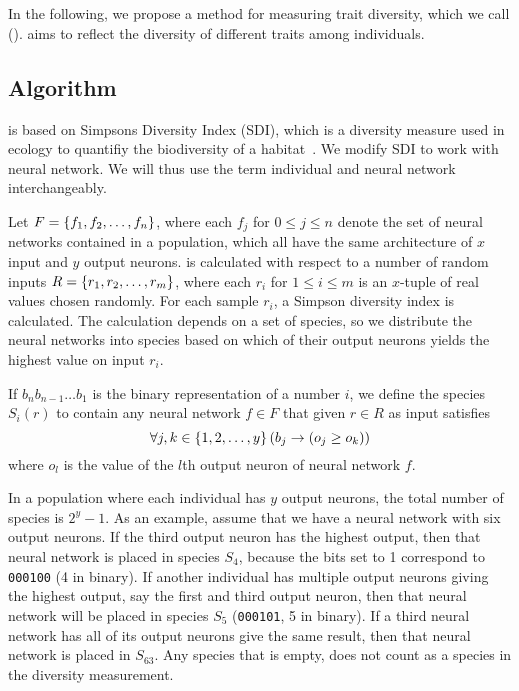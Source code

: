 \section{\di{}}
In the following, we propose a method for measuring trait diversity, which we call \emph{\di{}} (\dia). \dia{} aims to reflect the diversity of different traits among individuals. 

\subsection{Algorithm}
\dia{} is based on Simpsons Diversity Index (SDI), which is a diversity measure used in ecology to quantifiy the biodiversity of a habitat~\cite{simpson1949measurement}. We modify SDI to work with neural network. We will thus use the term individual and neural network interchangeably.

Let $F = \left\{ f_1, f_2, \dots, f_n \right\}$, where each $f_j$ for $0 \leq j \leq n$ denote the set of neural networks contained in a population, which all have the same architecture of $x$ input and $y$ output neurons. \dia{} is calculated with respect to a number of random inputs $R = \left\{ r_1, r_2, \dots, r_m \right\}$, where each $r_i$ for $1 \leq i \leq m$ is an $x$-tuple of real values chosen randomly. For each sample $r_i$, a Simpson diversity index is calculated. The calculation depends on a set of species, so we distribute the neural networks into species based on which of their output neurons yields the highest value on input $r_i$. 

If $b_nb_{n-1}\dots b_1$ is the binary representation of a number $i$,
we define the species $S_i(r)$ to contain any neural network $f \in F$ that given $r \in R$ as input satisfies
%
\[
  \forall j,k \in \left\{ 1,2,\dots,y \right\} \left(b_j \rightarrow \left(o_j \geq o_k\right)\right)
\]
%
where $o_l$ is the value of the $l$th output neuron of neural network $f$.

In a population where each individual has $y$ output neurons, the total number of species is $2^y - 1$.  As an example, assume that we have a neural network with six output neurons. If the third output neuron has the highest output, then that neural network is placed in species $S_4$, because the bits set to 1 correspond to \texttt{000100} (4 in binary). If another individual has multiple output neurons giving the highest output, say the first and third output neuron, then that neural network will be placed in species $S_5$ (\texttt{000101}, 5 in binary). If a third neural network has all of its output neurons give the same result, then that neural network is placed in $S_{63}$. Any species that is empty, does not count as a species in the diversity measurement.

